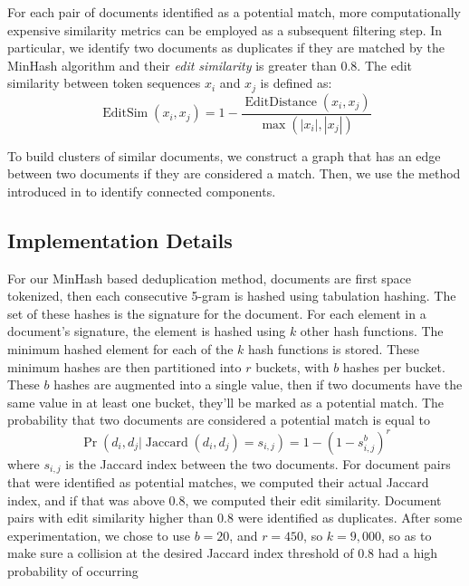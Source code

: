 For each pair of documents identified as a potential match, more computationally expensive similarity metrics can be employed as a subsequent filtering step.
In particular, we identify two documents as duplicates if they are matched by the MinHash algorithm and their \emph{edit similarity} is greater than 0.8. The edit similarity between token sequences $x_i$ and $x_j$ is defined as:
\begin{equation}
    \operatorname{EditSim}(x_i, x_j) = 1 - \frac{\operatorname{EditDistance}(x_i, x_j)}{\max(|x_i|, |x_j|)}
\end{equation}

\noindent To build clusters of similar documents, we construct a graph that has an edge between two documents if they are considered a match. Then, we use the method introduced in \citet{lacki2018connected} to identify  connected components.
%

\subsection{Implementation Details}
\label{section:minhash_details}
For our MinHash based deduplication method, documents are first space tokenized, then each consecutive 5-gram is hashed using tabulation hashing.
The set of these hashes is the signature for the document.
For each element in a document's signature, the element is hashed using $k$ other hash functions.
The minimum hashed element for each of the $k$ hash functions is stored.
These minimum hashes are then partitioned into $r$ buckets, with $b$ hashes per bucket.
These $b$ hashes are augmented into a single value, then if two documents have the same value in at least one bucket, they'll be marked as a potential match.
The probability that two documents are considered a potential match is equal to
\begin{equation}
\operatorname{Pr}(d_i, d_j | \operatorname{Jaccard}(d_i, d_j) = s_{i, j}) = 1 - (1 - s_{i, j}^b)^r
\end{equation}
where $s_{i,j}$ is the Jaccard index between the two documents.
For document pairs that were identified as potential matches, we computed their actual Jaccard index, and if that was above 0.8, we computed their edit similarity.
Document pairs with edit similarity higher than 0.8 were identified as duplicates.
After some experimentation, we chose to use $b=20$, and $r=450$, so $k=9,000$, so as to make sure a collision at the desired Jaccard index threshold of 0.8 had a high probability of occurring

